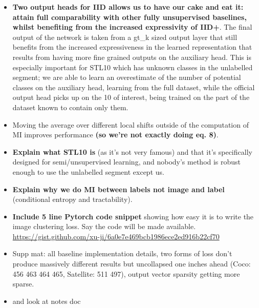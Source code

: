 \begin{itemize}
\item \textbf{Two output heads for IID allows us to have our cake and eat it: attain full comparability with other fully unsupervised baselines, whilst benefiting from the increased expressivity of IID+}. The final output of the network is taken from a gt\_k sized output layer that still benefits from the increased expressiveness in the learned representation that results from having more fine grained outputs on the auxiliary head. This is especially important for STL10 which has unknown classes in the unlabelled segment; we are able to learn an overestimate of the number of potential classes on the auxiliary head, learning from the full dataset, while the official output head picks up on the 10 of interest, being trained on the part of the dataset known to contain only them.

\item Moving the average over different local shifts outside of the computation of MI improves performance \textbf{(so we're not exactly doing eq. 8)}.

\item \textbf{Explain what STL10 is} (as it's not very famous) and that it's specifically designed for semi/unsupervised learning, and nobody's method is robust enough to use the unlabelled segment except us.

\item \textbf{Explain why we do MI between labels not image and label} (conditional entropy and tractability).

\item \textbf{Include 5 line Pytorch code snippet} showing how easy it is to write the image clustering loss. Say the code will be made available. \\ \url{https://gist.github.com/xu-ji/6a0e7e469bcb1986ece2ed916b22cf70}

\item Supp mat: all baseline implementation details, two forms of loss don't produce massively different results but uncollapsed one inches ahead (Coco: 456 463 464 465, Satellite: 511 497), output vector sparsity getting more sparse.

\item and look at notes doc

\end{itemize}

